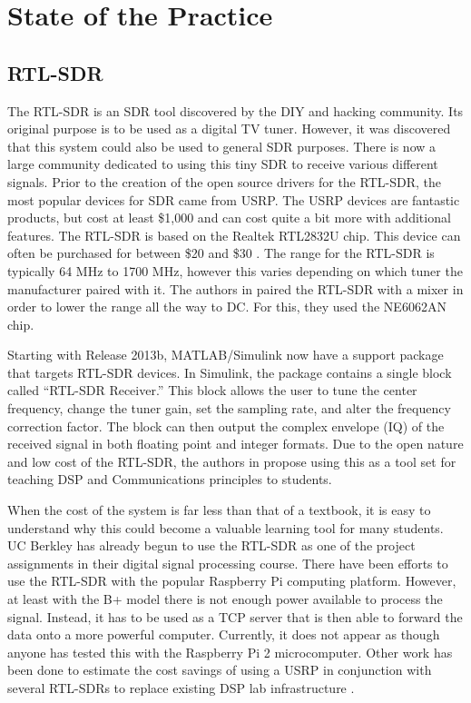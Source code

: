 
\section{State of the Practice}

\subsection{RTL-SDR}

	The RTL-SDR is an SDR tool discovered by the DIY and hacking community. Its original purpose is to be used as a digital TV tuner. However, it was discovered that this system could also be used to general SDR purposes. There is now a large community dedicated to using this tiny SDR to receive various different signals. Prior to the creation of the open source drivers for the RTL-SDR, the most popular devices for SDR came from USRP. The USRP devices are fantastic products, but cost at least \$1,000 and can cost quite a bit more with additional features. The RTL-SDR is based on the Realtek RTL2832U chip. This device can often be purchased for between \$20 and \$30 \cite{6526525}. The range for the RTL-SDR is typically 64 MHz	to 1700 MHz, however this varies depending on which tuner the manufacturer paired with it. The authors in \cite{6526525} paired the RTL-SDR with a mixer in order to lower the range all the way to DC. For this, they used the NE6062AN chip.  
	
	Starting with Release 2013b, MATLAB/Simulink now have a support package that targets RTL-SDR devices. In Simulink, the package contains a single block called ``RTL-SDR Receiver.'' This block allows the user to tune the center frequency, change the tuner gain, set the sampling rate, and alter the frequency correction factor. The block can then output the complex envelope (IQ) of the received signal in both floating point and integer formats\cite{6893337}.  Due to the open nature and low cost of the RTL-SDR, the authors in \cite{6821718} propose using this as a tool set for teaching DSP and Communications principles to students. 
	
	When the cost of the system is far less than that of a
	textbook, it is easy to understand why this could become a valuable learning tool for many students. UC Berkley has already begun to use the RTL-SDR as one of the project assignments in their digital signal processing course. 	There have been efforts to use the RTL-SDR with the popular Raspberry Pi computing platform. However, at least with the B+ model there is not enough power available to process the signal. Instead, it has to be used as a TCP server that is then able to forward the data onto a more powerful computer\cite{6938691}. Currently, it does not appear as though anyone has tested this with the Raspberry Pi 2 microcomputer. Other work has been done to estimate the cost savings of using a USRP in conjunction with several RTL-SDRs to replace existing DSP lab infrastructure \cite{6726630}. 
	
